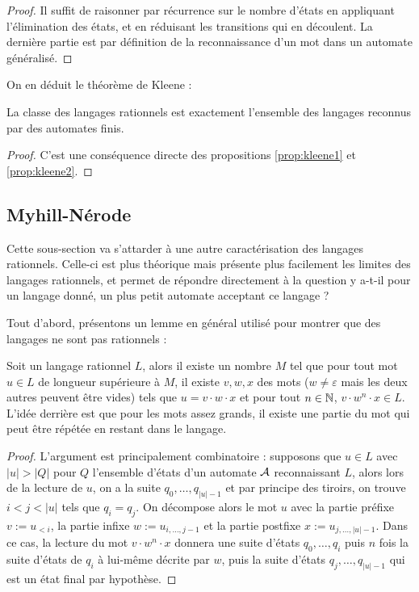 \begin{proof}
    Il suffit de raisonner par récurrence sur le nombre d'états en appliquant l'élimination des états, et en réduisant les transitions qui en découlent. La dernière partie est par définition de la reconnaissance d'un mot dans un automate généralisé.
\end{proof}

On en déduit le théorème de Kleene :

\begin{them}[Kleene]
    La classe des langages rationnels est exactement l'ensemble des langages reconnus par des automates finis.
\end{them}

\begin{proof}
    C'est une conséquence directe des propositions \ref{prop:kleene1} et \ref{prop:kleene2}.
\end{proof}

\subsection{Myhill-Nérode}

Cette sous-section va s'attarder à une autre caractérisation des langages rationnels. Celle-ci est plus théorique mais présente plus facilement les limites des langages rationnels, et permet de répondre directement à la question \og y a-t-il pour un langage donné, un plus petit automate acceptant ce langage ?\fg{}

Tout d'abord, présentons un lemme en général utilisé pour montrer que des langages ne sont pas rationnels :

\begin{lem}[De l'étoile]
    Soit un langage rationnel $L$, alors il existe un nombre $M$ tel que pour tout mot $u\in L$ de longueur supérieure à $M$, il existe $v,w,x$ des mots ($w\neq\varepsilon$ mais les deux autres peuvent être vides) tels que $u = v\cdot w\cdot x$ et pour tout $n\in \mathbb{N}$, $v\cdot w^n\cdot x \in L$. L'idée derrière est que pour les mots assez grands, il existe une partie du mot qui peut être répétée en restant dans le langage.
\end{lem}

\begin{proof}
    L'argument est principalement combinatoire : supposons que $u\in L$ avec $|u| > |Q|$ pour $Q$ l'ensemble d'états d'un automate $\mathcal A$ reconnaissant $L$, alors lors de la lecture de $u$, on a la suite $q_0,\ldots,q_{|u|-1}$ et par principe des tiroirs, on trouve $i< j < |u|$ tels que $q_i = q_j$. On décompose alors le mot $u$ avec la partie préfixe $v := u_{<i}$, la partie infixe $w := u_{i,\ldots,j-1}$ et la partie postfixe $x := u_{j,\ldots,|u|-1}$. Dans ce cas, la lecture du mot $v\cdot w^n\cdot x$ donnera une suite d'états $q_0,\ldots,q_i$ puis $n$ fois la suite d'états de $q_i$ à lui-même décrite par $w$, puis la suite d'états $q_j,\ldots,q_{|u|-1}$  qui est un état final par hypothèse.
\end{proof}

